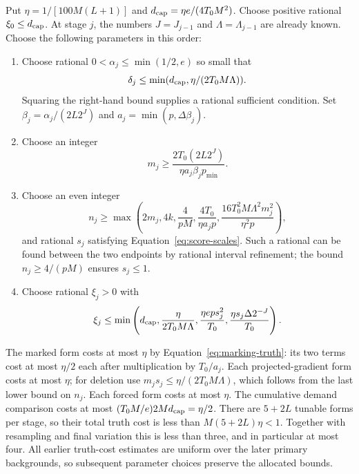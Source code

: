 Put $\eta=1/[100M(L+1)]$ and $d_{\rm cap}=\eta e/(4T_0M^2)$.
Choose positive rational $\xi_0\le d_{\rm cap}$. At stage $j$, the
numbers $J=J_{j-1}$ and $\Lambda=\Lambda_{j-1}$ are already known.
Choose the following parameters in this order:
\begin{enumerate}
\item Choose rational $0<\alpha_j\le\min(1/2,e)$ so small that
\[
 \delta_j\le\min(d_{\rm cap},\eta/(2T_0M\Lambda)).
\]
Squaring the right-hand bound supplies a rational sufficient condition.
Set $\beta_j=\alpha_j/(2L2^J)$ and $a_j=\min(p,\Delta\beta_j)$.
\item Choose an integer
\[
 m_j\ge\frac{2T_0(2L2^J)}{\eta a_j\beta_jp_{\min}}.
\]
\item Choose an even integer
\[
 n_j\ge\max\left(2m_j,4k,\frac4{pM},\frac{4T_0}{\eta a_jp},
             \frac{16T_0^2M\Lambda^2m_j^2}{\eta^2p}\right),
\]
and rational $s_j$ satisfying Equation~\ref{eq:score-scales}. Such a
rational can be found between the two endpoints by rational interval
refinement; the bound $n_j\ge4/(pM)$ ensures $s_j\le1$.
\item Choose rational $\xi_j>0$ with
\[
 \xi_j\le\min\left(d_{\rm cap},\frac\eta{2T_0M\Lambda},
          \frac{\eta e p s_j^2}{T_0},
          \frac{\eta s_j\Delta2^{-J}}{T_0}\right).
\]
\end{enumerate}
The marked form costs at most $\eta$ by
Equation~\ref{eq:marking-truth}: its two terms cost at most $\eta/2$
each after multiplication by $T_0/a_j$. Each projected-gradient form
costs at most $\eta$; for deletion use
$m_js_j\le\eta/(2T_0M\Lambda)$, which follows from the last lower
bound on $n_j$. Each forced form costs at most $\eta$. The cumulative
demand comparison costs at most
$(T_0M/e)2Md_{\rm cap}=\eta/2$. There are $5+2L$ tunable forms per
stage, so their total truth cost is less than
$M(5+2L)\eta<1$. Together with resampling and final variation this is
less than three, and in particular at most four. All earlier truth-cost
estimates are uniform over the later primary backgrounds, so subsequent
parameter choices preserve the allocated bounds.


